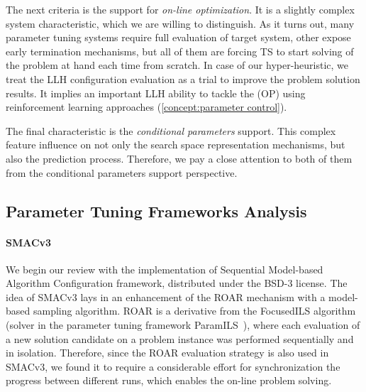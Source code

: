 The next criteria is the support for \emph{on-line optimization}. It is a slightly complex system characteristic, which we are willing to distinguish. As it turns out, many parameter tuning systems require full evaluation of target system, other expose early termination mechanisms, but all of them are forcing TS to start solving of the problem at hand each time from scratch. In case of our hyper-heuristic, we treat the LLH configuration evaluation as a trial to improve the problem solution results. It implies an important LLH ability to tackle the (OP) using reinforcement learning approaches (\cref{concept:parameter control}).

The final characteristic is the \emph{conditional parameters} support. This complex feature influence on not only the search space representation mechanisms, but also the prediction process. Therefore, we pay a close attention to both of them from the conditional parameters support perspective.

\subsection{Parameter Tuning Frameworks Analysis}\label{impl: Parameter Tuning Frameworks Analysis}
\paragraph{SMACv3}
We begin our review with the implementation of Sequential Model-based Algorithm Configuration framework, distributed under the BSD-3 license. The idea of SMACv3 lays in an enhancement of the ROAR mechanism with a model-based sampling algorithm. ROAR is a derivative from the FocusedILS algorithm (solver in the parameter tuning framework ParamILS~\cite{hutter2009paramils}), where each evaluation of a new solution candidate on a problem instance was performed sequentially and in isolation. Therefore, since the ROAR evaluation strategy is also used in SMACv3, we found it to require a considerable effort for synchronization the progress between different runs, which enables the on-line problem solving.


